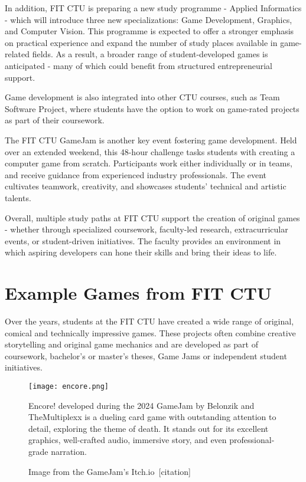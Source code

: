 In addition, FIT CTU is preparing a new study programme - Applied Informatics - which will introduce three new specializations: Game Development, Graphics, and Computer Vision. This programme is expected to offer a stronger emphasis on practical experience and expand the number of study places available in game-related fields. As a result, a broader range of student-developed games is anticipated - many of which could benefit from structured entrepreneurial support.

Game development is also integrated into other CTU courses, such as Team Software Project, where students have the option to work on game-rated projects as part of their coursework.

The FIT CTU GameJam is another key event fostering game development. Held over an extended weekend, this 48-hour challenge tasks students with creating a computer game from scratch. Participants work either individually or in teams, and receive guidance from experienced industry professionals. The event cultivates teamwork, creativity, and showcases students’ technical and artistic talents.

Overall, multiple study paths at FIT CTU support the creation of original games - whether through specialized coursework, faculty-led research, extracurricular events, or student-driven initiatives. The faculty provides an environment in which aspiring developers can hone their skills and bring their ideas to life.

\section{Example Games from FIT CTU}
Over the years, students at the FIT CTU have created a wide range of original, comical and technically impressive games. These projects often combine creative storytelling and original game mechanics and are developed as part of coursework, bachelor’s or master’s theses, Game Jams or independent student initiatives.

\begin{figure}[H]
    \texttt{[image: encore.png]}
    \caption{Image from the GameJam's Itch.io~[citation]}
    \label{fig:encore-picture}
    Encore! developed during the 2024 GameJam by Belonzik and TheMultiplexx is a dueling card game with outstanding attention to detail, exploring the theme of death. It stands out for its excellent graphics, well-crafted audio, immersive story, and even professional-grade narration.
\end{figure}

